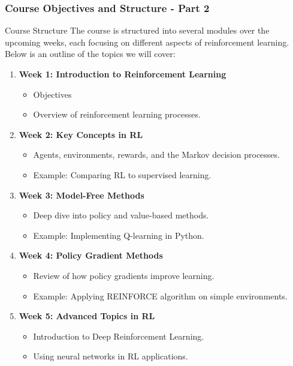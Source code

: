 \documentclass[aspectratio=169]{beamer}
\begin{document}
\begin{frame}[fragile]
  \frametitle{Course Objectives and Structure - Part 2}

  \begin{block}{Course Structure}
    The course is structured into several modules over the upcoming weeks, each focusing on different aspects of reinforcement learning. Below is an outline of the topics we will cover:
    
    \begin{enumerate}
      \item \textbf{Week 1: Introduction to Reinforcement Learning}
        \begin{itemize}
          \item Objectives
          \item Overview of reinforcement learning processes.
        \end{itemize}
      \item \textbf{Week 2: Key Concepts in RL}
        \begin{itemize}
          \item Agents, environments, rewards, and the Markov decision processes.
          \item Example: Comparing RL to supervised learning.
        \end{itemize}
      \item \textbf{Week 3: Model-Free Methods}
        \begin{itemize}
          \item Deep dive into policy and value-based methods.
          \item Example: Implementing Q-learning in Python.
        \end{itemize}
      \item \textbf{Week 4: Policy Gradient Methods}
        \begin{itemize}
          \item Review of how policy gradients improve learning.
          \item Example: Applying REINFORCE algorithm on simple environments.
        \end{itemize}
      \item \textbf{Week 5: Advanced Topics in RL}
        \begin{itemize}
          \item Introduction to Deep Reinforcement Learning.
          \item Using neural networks in RL applications.
        \end{itemize}

\end{enumerate}
\end{block}
\end{frame}
\end{document}
